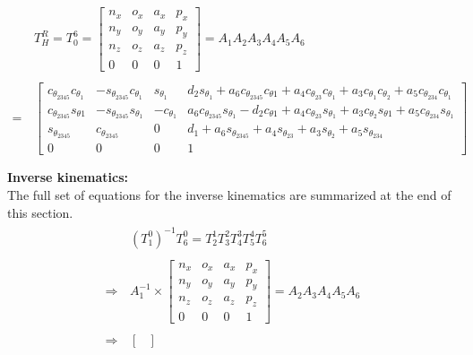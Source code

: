 \documentclass[11pt,a4paper, titlepage]{article}
\begin{document}
\begin{appendices}
\begin{equation*}
\begin{split}
&T_{H}^{R} = T_{0}^{6} =
\begin{bmatrix}
n_x & o_x & a_x & p_x \\
n_y & o_y & a_y & p_y \\
n_z & o_z & a_z & p_z \\
0 & 0 & 0 & 1			 
\end{bmatrix}
= A_1 A_2 A_3 A_4 A_5 A_6 \\\\
=\, &\begin{bmatrix}
c_{\theta_{2345}}c_{\theta_1} & -s_{\theta_{2345}}c_{\theta_1} & s_{\theta_1} & d_2s_{\theta_1} + a_6c_{\theta_{2345}}c_{\theta1} + a_4c_{\theta_{23}}c_{\theta_1} + a_3c_{\theta_1}c_{\theta_2} + a_5c_{\theta_{234}}c_{\theta_1} \\
c_{\theta_{2345}}s_{\theta1} & 
-s_{\theta_{2345}}s_{\theta_1} & 
-c_{\theta_1} & 
a_6c_{\theta_{2345}}s_{\theta_1} - d_2c_{\theta1} + a_4c_{\theta_{23}}s_{\theta_1} + a_3c_{\theta_2}s_{\theta1} + a_5c_{\theta_{234}}s_{\theta_1} \\
s_{\theta_{2345}} & c_{\theta_{2345}} & 0 & d_1 + a_6s_{\theta_{2345}} + a_4s_{\theta_{23}} + a_3s_{\theta_2} + a_5s_{\theta_{234}} \\
0 & 0 & 0 & 1			 
\end{bmatrix} \\\\
\end{split}
\end{equation*}
\newpage
\noindent\textbf{Inverse kinematics:} \\
The full set of equations for the inverse kinematics are summarized at the end of this section.
\begin{align*}
\begin{split}
&(T_{1}^{0})^{-1}T_{6}^{0} =
T_{2}^{1}T_{3}^{2}T_{4}^{3}T_{5}^{4}T_{6}^{5} \\\\
\Rightarrow\, &A_{1}^{-1} \times
\begin{bmatrix}
n_x & o_x & a_x & p_x \\
n_y & o_y & a_y & p_y \\
n_z & o_z & a_z & p_z \\
0 & 0 & 0 & 1	
\end{bmatrix} = A_2 A_3 A_4 A_5 A_6 \\\\
\Rightarrow\, &\begin{bmatrix}

\end{bmatrix}
\end{split}
\end{align*}
\end{appendices}
\end{document}
